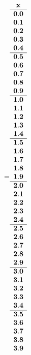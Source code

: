  =\hbox{$\begin{array}{c}
 \bf x 
  \\ \hline 
\bf  0.0 \\ 
\bf  0.1 \\ 
\bf  0.2 \\ 
\bf  0.3 \\ 
\bf  0.4
  \\ \hline 
\bf  0.5 \\ 
\bf  0.6 \\ 
\bf  0.7 \\ 
\bf  0.8 \\ 
\bf  0.9
  \\ \hline 
\bf  1.0 \\ 
\bf  1.1 \\ 
\bf  1.2 \\ 
\bf  1.3 \\ 
\bf  1.4
  \\ \hline 
\bf  1.5 \\ 
\bf  1.6 \\ 
\bf  1.7 \\ 
\bf  1.8 \\ 
\bf  1.9
  \\ \hline 
\bf  2.0 \\ 
\bf  2.1 \\ 
\bf  2.2 \\ 
\bf  2.3 \\ 
\bf  2.4
  \\ \hline 
\bf  2.5 \\ 
\bf  2.6 \\ 
\bf  2.7 \\ 
\bf  2.8 \\ 
\bf  2.9
  \\ \hline 
\bf  3.0 \\ 
\bf  3.1 \\ 
\bf  3.2 \\ 
\bf  3.3 \\ 
\bf  3.4
  \\ \hline 
\bf  3.5 \\ 
\bf  3.6 \\ 
\bf  3.7 \\ 
\bf  3.8 \\ 
\bf  3.9
 \end{array}$}
